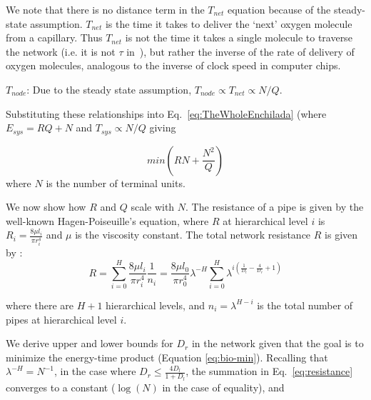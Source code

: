 \documentclass[12pt]{article}
\begin{document}
We note that there is no distance term in the $T_{net}$ equation because of the
steady-state assumption. $T_{net}$ is the time it takes to deliver the `next'
oxygen molecule from a capillary. Thus $T_{net}$ is not the time it takes a
single molecule to traverse the network (i.e. it is not $\tau$
in~\cite{banavar10}), but rather the inverse of the rate of delivery of
oxygen molecules, analogous to the inverse of clock speed in computer chips.

$T_{node}$: Due to the steady state assumption, $T_{node} \propto T_{net} \propto N/Q$. 



Substituting these relationships into Eq.~\ref{eq:TheWholeEnchilada} (where $E_{sys} = RQ + N$ and $T_{sys} \propto N/Q$ giving

\begin{equation}
 min (RN + \frac{N^2}{Q})
\label{eq:bio-min}
\end{equation}
\noindent where $N$ is the number of terminal units.  

We now show how $R$ and $Q$ scale with $N$. The resistance of a pipe is given by the well-known Hagen-Poiseuille's
equation, where $R$ at hierarchical level $i$ is $R_i = \frac{8\mu l_i}{\pi
r_i^4}$ and $\mu$ is the viscosity constant.  The total network resistance
$R$ is given by \cite{west97}:
\begin{equation}
\label{eq:resistance}
R = \sum_{i=0}^H \frac{8\mu l_i}{\pi r_i^4}\frac{1}{n_i}
= \frac{8\mu l_0}{\pi r_0^4} \lambda^{-H}\sum_{i=0}^H \lambda^{i 
\left(\frac{1}{D_l} - \frac{4}{D_r} + 1 \right)}
\end{equation}

\noindent where there are $H+1$ hierarchical levels, and $n_i = \lambda^{H-i}$
is the total number of pipes at hierarchical level $i$.  

We derive upper and lower bounds for $D_r$ in the network given that the goal
is to minimize the energy-time product (Equation \ref{eq:bio-min}).  Recalling
that $\lambda^{-H} = N^{-1}$, in the case
where $D_r \leq \frac{4D_l}{1+D_l}$, the summation in Eq.~\ref{eq:resistance} converges to a
constant ($\log(N)$ in the case of equality), and 
\end{document}
